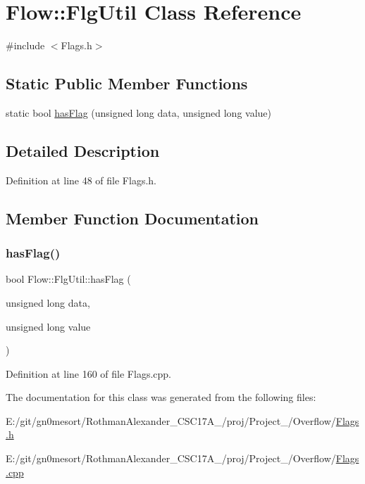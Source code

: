 \hypertarget{class_flow_1_1_flg_util}{}\section{Flow\+:\+:Flg\+Util Class Reference}
\label{class_flow_1_1_flg_util}


{\ttfamily \#include $<$Flags.\+h$>$}

\subsection*{Static Public Member Functions}
\begin{DoxyCompactItemize}
\item 
static bool \hyperlink{class_flow_1_1_flg_util_a8e714f79a855912792ea53991ee72c5c}{has\+Flag} (unsigned long data, unsigned long value)
\end{DoxyCompactItemize}


\subsection{Detailed Description}


Definition at line 48 of file Flags.\+h.



\subsection{Member Function Documentation}
\hypertarget{class_flow_1_1_flg_util_a8e714f79a855912792ea53991ee72c5c}{}\label{class_flow_1_1_flg_util_a8e714f79a855912792ea53991ee72c5c} 
\subsubsection{\texorpdfstring{has\+Flag()}{hasFlag()}}
{\footnotesize\ttfamily bool Flow\+::\+Flg\+Util\+::has\+Flag (\begin{DoxyParamCaption}\item[{unsigned long}]{data,  }\item[{unsigned long}]{value }\end{DoxyParamCaption})\hspace{0.3cm}{\ttfamily [static]}}



Definition at line 160 of file Flags.\+cpp.



The documentation for this class was generated from the following files\+:\begin{DoxyCompactItemize}
\item 
E\+:/git/gn0mesort/\+Rothman\+Alexander\+\_\+\+C\+S\+C17\+A\+\_/proj/\+Project\+\_/\+Overflow/\hyperlink{_flags_8h}{Flags.\+h}\item 
E\+:/git/gn0mesort/\+Rothman\+Alexander\+\_\+\+C\+S\+C17\+A\+\_/proj/\+Project\+\_/\+Overflow/\hyperlink{_flags_8cpp}{Flags.\+cpp}\end{DoxyCompactItemize}
